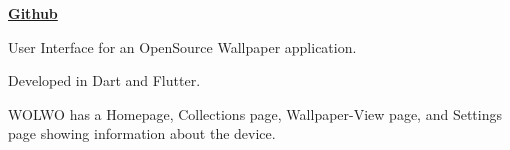 \documentclass[]{deedy-resume-openfont}
\begin{document}
\begin{minipage}[t]{0.65\textwidth}

 \href{https://github.com/meyash/wolwo}{\bf Github}
\location{}
\begin{tightemize}
\item User Interface for an OpenSource Wallpaper application.
\item Developed in Dart and Flutter.
\item WOLWO has a Homepage, Collections page, Wallpaper-View page, and Settings page showing information about the device.
\end{tightemize}
\sectionsep




% 
% 

\end{minipage} 
\end{document}
